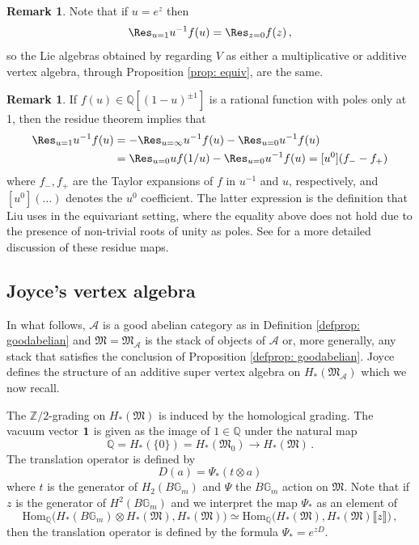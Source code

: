 \documentclass[12pt]{amsart}
\theoremstyle{definition}
\newtheorem{remark}[definition]{Remark}
\newcommand{\BG}{{\mathbb{G}}}
\newcommand{\BQ}{{\mathbb{Q}}}
\newcommand{\BZ}{{\mathbb{Z}}}
\newcommand{\CA}{{\mathcal A}}
\newcommand{\1}{\mathbf 1}
\newcommand{\FM}{{\mathfrak{M}}}
\newcommand{\Hom}{\mathrm{Hom}}
\begin{document}
\begin{remark}\label{rmk: residuechangevariables}
Note that if $u=e^z$ then
    \[\Res_{u=1}u^{-1}f(u)=\Res_{z=0}f(z)\,,\]
    so the Lie algebras obtained by regarding $V$ as either a multiplicative or additive vertex algebra, through Proposition \ref{prop: equiv}, are the same.
\end{remark}

\begin{remark}\label{rmk: polesresidue}
If $f(u)\in \BQ[(1-u)^{\pm 1}]$ is a rational function with poles only at 1, then the residue theorem implies that 
\begin{align*}\Res_{u=1}u^{-1}f(u)&=-\Res_{u=\infty}u^{-1}f(u)-\Res_{u=0}u^{-1}f(u)\\
&=\Res_{u=0}uf(1/u)-\Res_{u=0}u^{-1}f(u)=[u^0](f_--f_+)\end{align*}
where $f_-, f_+$ are the Taylor expansions of $f$ in $u^{-1}$ and $u$, respectively, and $[u^0](\ldots)$ denotes the $u^0$ coefficient. The latter expression is the definition that Liu uses in the equivariant setting, where the equality above does not hold due to the presence of non-trivial roots of unity as poles. See \cite[Appendix A]{Liu} for a more detailed discussion of these residue maps.
\end{remark}



\subsection{Joyce's vertex algebra}\label{subsec: JoyceVA}

In what follows, $\CA$ is a good abelian category as in Definition \ref{defprop: goodabelian} and $\FM=\FM_{\CA}$ is the stack of objects of $\CA$ or, more generally, any stack that satisfies the conclusion of Proposition \ref{defprop: goodabelian}. Joyce defines the structure of an additive super vertex algebra on $H_\ast(\FM_{\CA})$ which we now recall. 

The $\BZ/2$-grading on $H_\ast(\FM)$ is induced by the homological grading. The vacuum vector $\textbf 1$ is given as the image of $1 \in \mathbb Q$ under the natural map 
\[\mathbb Q =  H_\ast(\{0\})= H_\ast(\FM_0)  \to H_\ast(\FM)\,.\]
The translation operator is defined by
\[D(a)=\Psi_\ast(t\otimes a)\]
where $t$ is the generator of $H_2(B\BG_m)$ and $\Psi$ the $B\BG_m$ action on $\FM$. Note that if $z$ is the generator of $H^2(B\BG_m)$ and we interpret the map $\Psi_*$ as an element of
\[\Hom_\BQ\big(H_\ast(B\BG_m)\otimes H_\ast(\FM), H_\ast(\FM)\big)\simeq \Hom_\BQ\big(H_\ast(\FM), H_\ast(\FM)\llbracket z\rrbracket\big)\,,\] 
then the translation operator is defined by the formula $\Psi_\ast = e^{zD}$.
\end{document}
